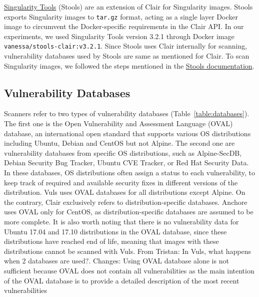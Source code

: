 \documentclass[a4paper,num-refs]{oup-contemporary}
\newcommand{\change}[2]{\color{cyan}Changes: #1\color{black}}
\newcommand{\tristan}[1]{\color{red}From Tristan: #1\color{black}}
\begin{document}
\href{https://github.com/singularityhub/stools}{Singularity Tools} (Stools)
are an extension of Clair for Singularity images. Stools
exports Singularity images to \texttt{tar.gz} format, acting as a single layer Docker image
to circumvent the Docker-specific requirements in the Clair API.
In our experiments, we used Singularity Tools version 3.2.1 through Docker
image
\texttt{vanessa/stools-clair:v3.2.1}.
Since Stools uses Clair internally for scanning, vulnerability databases used
by Stools are same as mentioned for Clair.
To scan Singularity images, we followed the steps mentioned in the
\href{https://github.com/singularityhub/stools}{Stools documentation}.

\subsection{Vulnerability Databases}

Scanners refer to two types of
vulnerability databases (Table~\ref{table:databases}). The first one is the Open Vulnerability and
Assessment Language (OVAL) database, an international open standard that
supports various OS distributions including Ubuntu, Debian and CentOS but
not Alpine. The second one are vulnerability databases from specific OS
distributions, such as Alpine-SecDB, Debian Security Bug Tracker, Ubuntu
CVE Tracker, or Red Hat Security Data. In these databases, OS distributions often assign a
status to each vulnerability, to keep track of required and available
security fixes in different versions of the distribution. Vuls uses OVAL
databases for all distributions except Alpine. On the contrary, Clair exclusively refers to
distribution-specific databases. Anchore uses OVAL only for CentOS, as distribution-specific databases
are assumed to be more complete.
It is also worth noting that there is no vulnerability data
for Ubuntu 17.04 and 17.10 distributions in the OVAL database, since these
distributions have reached end of life, meaning that images with these
distributions cannot be scanned with Vuls.
\tristan{In Vuls, what happens when 2 databases are used?}.
\change{Using OVAL database alone is not sufficient because
OVAL does not contain all vulnerabilities as the main intention
of the OVAL database is to provide a detailed description of the most recent vulnerabilities}.
\end{document}
